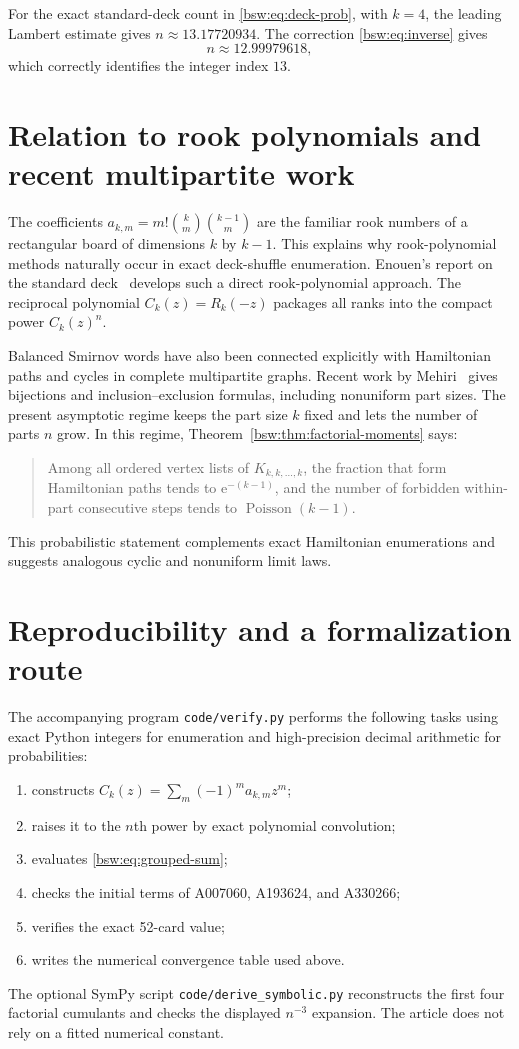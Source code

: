 \documentclass[11pt,letterpaper]{article}
\theoremstyle{definition}
\theoremstyle{remark}
\newcommand{\ee}{\mathrm e}
\newcommand{\Pois}{\operatorname{Poisson}}
\begin{document}
For the exact standard-deck count in \eqref{bsw:eq:deck-prob}, with $k=4$, the
leading Lambert estimate gives $n\approx13.17720934$.  The correction
\eqref{bsw:eq:inverse} gives
\[
 n\approx12.99979618,
\]
which correctly identifies the integer index $13$.

\section{Relation to rook polynomials and recent multipartite work}

The coefficients $a_{k,m}=m!\binom{k}{m}\binom{k-1}{m}$ are the familiar
rook numbers of a rectangular board of dimensions $k$ by $k-1$.  This
explains why rook-polynomial methods naturally occur in exact deck-shuffle
enumeration.  Enouen's report on the standard deck~\cite{enouen} develops such a direct
rook-polynomial approach.  The reciprocal polynomial $C_k(z)=R_k(-z)$ packages
all ranks into the compact power $C_k(z)^n$.

Balanced Smirnov words have also been connected explicitly with Hamiltonian
paths and cycles in complete multipartite graphs.  Recent work by
Mehiri~\cite{mehiri} gives
bijections and inclusion--exclusion formulas, including nonuniform part sizes.
The present asymptotic regime keeps the part size $k$ fixed and lets the number
of parts $n$ grow.  In this regime, Theorem~\ref{bsw:thm:factorial-moments} says:
\begin{quote}
Among all ordered vertex lists of $K_{k,k,\ldots,k}$, the fraction that form
Hamiltonian paths tends to $\ee^{-(k-1)}$, and the number of forbidden
within-part consecutive steps tends to $\Pois(k-1)$.
\end{quote}
This probabilistic statement complements exact Hamiltonian enumerations and
suggests analogous cyclic and nonuniform limit laws.

\section{Reproducibility and a formalization route}

The accompanying program \texttt{code/verify.py} performs the following tasks
using exact Python integers for enumeration and high-precision decimal
arithmetic for probabilities:
\begin{enumerate}[leftmargin=2em]
\item constructs $C_k(z)=\sum_m(-1)^ma_{k,m}z^m$;
\item raises it to the $n$th power by exact polynomial convolution;
\item evaluates \eqref{bsw:eq:grouped-sum};
\item checks the initial terms of A007060, A193624, and A330266;
\item verifies the exact 52-card value;
\item writes the numerical convergence table used above.
\end{enumerate}
The optional SymPy script \texttt{code/derive\_symbolic.py} reconstructs the
first four factorial cumulants and checks the displayed $n^{-3}$ expansion.
The article does not rely on a fitted numerical constant.
\end{document}
